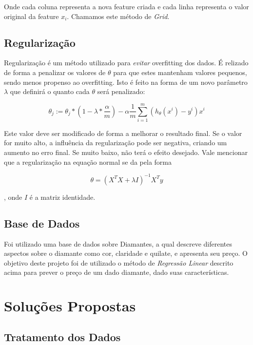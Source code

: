 \documentclass[conference]{IEEEtran}
\begin{document}
Onde cada coluna representa a nova feature criada e cada linha representa o valor original da feature $x_{i}$. Chamamos este método de \textit{Grid}.

\subsection{Regularização}

Regularização é um método utilizado para \textit{evitar} overfitting dos dados. É relizado de forma a penalizar os valores de $\theta$ para que estes mantenham valores pequenos, sendo menos propenso ao overfitting. Isto é feito na forma de um novo parâmetro $\lambda$ que definirá o quanto cada $\theta$ será penalizado:

\begin{equation} \label{eq:regularization}
\theta_{j} := \theta_{j} * (1 - \lambda * \dfrac{\alpha}{m}) - \alpha \dfrac{1}{m} \sum_{i=1}^{m}(h_{\theta}(x^{i}) - y^{i}) x^{i}
\end{equation}

Este valor deve ser modificado de forma a melhorar o resultado final. Se o valor for muito alto, a influência da regularização pode ser negativa, criando um aumento no erro final. Se muito baixo, não terá o efeito desejado. Vale mencionar que a regularização na equação normal se da pela forma

\begin{equation} \label{eq:normal_reg}
\theta = (X^{T}X + \lambda I)^{-1}X^{T}y
\end{equation}

, onde $I$ é a matriz identidade.

\subsection{Base de Dados}

Foi utilizado uma base de dados sobre Diamantes, a qual descreve diferentes aspectos sobre o diamante como cor, claridade e quilate, e apresenta seu preço. O objetivo deste projeto foi de utilizado o método de \textit{Regressão Linear} descrito acima para prever o preço de um dado diamante, dado suas características.

\section{Soluções Propostas}

\subsection{Tratamento dos Dados}
\end{document}
